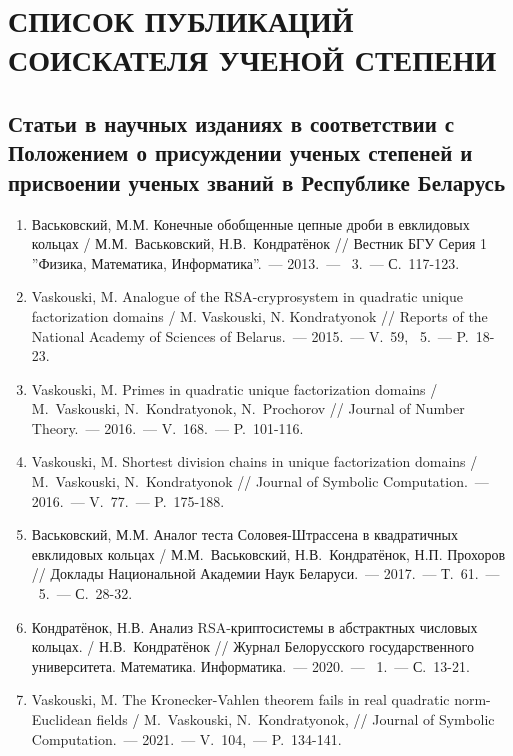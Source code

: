 \documentclass[_00_autoref.tex]{subfiles}
\begin{document}
\chapter*{\MakeUppercase{Список публикаций соискателя ученой степени}}

\renewcommand{\labelenumi}{\arabic{enumi}--A}
\renewcommand{\theenumi}{\arabic{enumi}--A}


\vspace{-4ex}
\section*{\fontsize{14}{15}\selectfont Статьи в научных изданиях в соответствии с Положением о присуждении ученых степеней и присвоении ученых званий в Республике Беларусь}
\vspace{-4ex}

\begin{enumerate}

    \item \label{source:Vestnik_BSU_2013}
    Васьковский, М.М. Конечные обобщенные цепные дроби в евклидовых кольцах / М.М.~Васьковский, Н.В.~Кондратёнок // Вестник БГУ Серия 1 ''Физика, Математика, Информатика''.~--- 2013.~--- \textnumero~3.~--- С.~117-123.

    \item \label{source:NANB_2015}
    Vaskouski, M. Analogue of the RSA-cryprosystem in quadratic unique factorization domains / M. Vaskouski, N. Kondratyonok // Reports of the National Academy of Sciences of Belarus.~--- 2015.~--- V.~59, \textnumero~5.~--- P.~18-23.

    \item \label{source:JNT_2016}
    Vaskouski, M. Primes in quadratic unique factorization domains / M.~Vaskouski, N.~Kondratyonok, N.~Prochorov // Journal of Number Theory.~--- 2016.~--- V.~168.~--- P.~101-116.

    \item \label{source:JSC_2016}
    Vaskouski, M. Shortest division chains in unique factorization domains / M.~Vaskouski, N.~Kondratyonok // Journal of Symbolic Computation.~--- 2016.~--- V.~77.~--- P.~175-188.

    \item \label{source:NANB_2017}
    Васьковский, М.М. Аналог теста Соловея-Штрассена в квадратичных евклидовых кольцах / М.М.~Васьковский, Н.В.~Кондратёнок, Н.П. Прохоров // Доклады Национальной Академии Наук Беларуси.~--- 2017.~--- Т.~61.~--- \textnumero~5.~--- С.~28-32.

    \item \label{source:BSU_Journal_2020}
    Кондратёнок, Н.В. Анализ RSA-криптосистемы в абстрактных числовых кольцах. / Н.В.~Кондратёнок // Журнал Белорусского государственного университета. Математика. Информатика.~--- 2020.~--- \textnumero~1.~--- С.~13-21.

    \item \label{source:JSC_2021}
    Vaskouski, M. The Kronecker-Vahlen theorem fails in real quadratic norm-Euclidean fields / M.~Vaskouski, N.~Kondratyonok, // Journal of Symbolic Computation.~--- 2021.~--- V.~104,~--- P.~134-141.
\end{enumerate}
\end{document}
